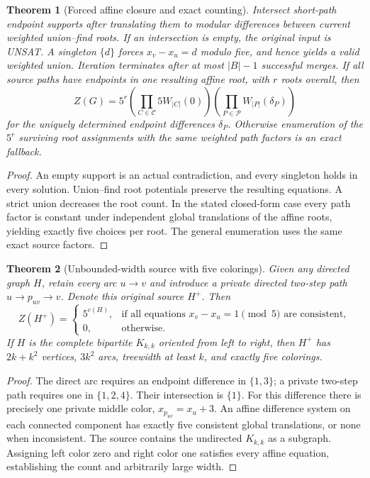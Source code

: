 \documentclass[11pt]{article}
\newtheorem{theorem}{Theorem}
\begin{document}
\begin{theorem}[Forced affine closure and exact counting]
Intersect short-path endpoint supports after translating them
to modular differences between current weighted union--find
roots. If an intersection is empty, the original input is
UNSAT. A singleton $\{d\}$ forces $x_v-x_u=d$ modulo five,
and hence yields a valid weighted union. Iteration terminates
after at most $|B|-1$ successful merges. If all source paths
have endpoints in one resulting affine root, with $r$ roots
overall, then
\[
Z(G)=5^r\left(\prod_{C\in\mathcal C}5W_{|C|}(0)\right)
\left(\prod_{P\in\mathcal P}W_{|P|}(\delta_P)\right)
\]
for the uniquely determined endpoint differences $\delta_P$.
Otherwise enumeration of the $5^r$ surviving root assignments
with the same weighted path factors is an exact fallback.
\end{theorem}
\begin{proof}
An empty support is an actual contradiction, and every
singleton holds in every solution. Union--find root potentials
preserve the resulting equations. A strict union decreases
the root count. In the stated closed-form case every path
factor is constant under independent global translations
of the affine roots, yielding exactly five choices per root.
The general enumeration uses the same exact source factors.
\end{proof}

\begin{theorem}[Unbounded-width source with five colorings]
Given any directed graph $H$, retain every arc $u\to v$ and
introduce a private directed two-step path
$u\to p_{uv}\to v$. Denote this original source $H^+$.
Then
\[
Z(H^+)=
\begin{cases}
5^{c(H)},&\text{if all equations }x_v-x_u=1\pmod5
\text{ are consistent},\\
0,&\text{otherwise}.
\end{cases}
\]
If $H$ is the complete bipartite $K_{k,k}$ oriented from
left to right, then $H^+$ has $2k+k^2$ vertices, $3k^2$
arcs, treewidth at least $k$, and exactly five colorings.
\end{theorem}
\begin{proof}
The direct arc requires an endpoint difference in
$\{1,3\}$; a private two-step path requires one in
$\{1,2,4\}$. Their intersection is $\{1\}$.
For this difference there is precisely one private
middle color, $x_{p_{uv}}=x_u+3$.
An affine difference system on each connected component
has exactly five consistent global translations, or none
when inconsistent. The source contains the undirected
$K_{k,k}$ as a subgraph. Assigning left color zero and
right color one satisfies every affine equation, establishing
the count and arbitrarily large width.
\end{proof}
\end{document}
